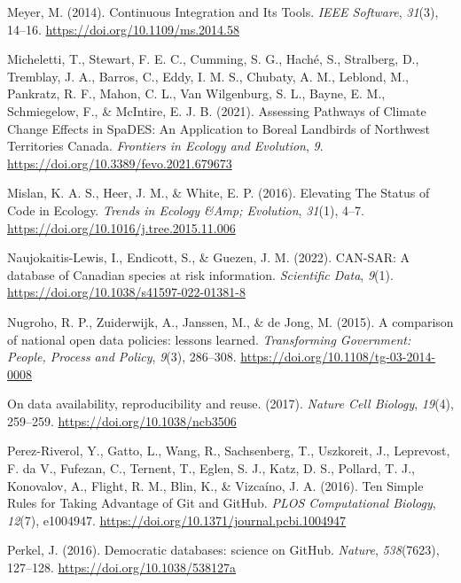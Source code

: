 \begin{CSLReferences}{1}{0}
\leavevmode{}%
Meyer, M. (2014). Continuous Integration and Its Tools. \emph{IEEE Software}, \emph{31}(3), 14--16. \url{https://doi.org/10.1109/ms.2014.58}

\leavevmode{}%
Micheletti, T., Stewart, F. E. C., Cumming, S. G., Haché, S., Stralberg, D., Tremblay, J. A., Barros, C., Eddy, I. M. S., Chubaty, A. M., Leblond, M., Pankratz, R. F., Mahon, C. L., Van Wilgenburg, S. L., Bayne, E. M., Schmiegelow, F., \& McIntire, E. J. B. (2021). Assessing Pathways of Climate Change Effects in SpaDES: An Application to Boreal Landbirds of Northwest Territories Canada. \emph{Frontiers in Ecology and Evolution}, \emph{9}. \url{https://doi.org/10.3389/fevo.2021.679673}

\leavevmode{}%
Mislan, K. A. S., Heer, J. M., \& White, E. P. (2016). Elevating The Status of Code in Ecology. \emph{Trends in Ecology \&Amp; Evolution}, \emph{31}(1), 4--7. \url{https://doi.org/10.1016/j.tree.2015.11.006}

\leavevmode{}%
Naujokaitis-Lewis, I., Endicott, S., \& Guezen, J. M. (2022). CAN-SAR: A database of Canadian species at risk information. \emph{Scientific Data}, \emph{9}(1). \url{https://doi.org/10.1038/s41597-022-01381-8}

\leavevmode{}%
Nugroho, R. P., Zuiderwijk, A., Janssen, M., \& de Jong, M. (2015). A comparison of national open data policies: lessons learned. \emph{Transforming Government: People, Process and Policy}, \emph{9}(3), 286--308. \url{https://doi.org/10.1108/tg-03-2014-0008}

\leavevmode{}%
On data availability, reproducibility and reuse. (2017). \emph{Nature Cell Biology}, \emph{19}(4), 259--259. \url{https://doi.org/10.1038/ncb3506}

\leavevmode{}%
Perez-Riverol, Y., Gatto, L., Wang, R., Sachsenberg, T., Uszkoreit, J., Leprevost, F. da V., Fufezan, C., Ternent, T., Eglen, S. J., Katz, D. S., Pollard, T. J., Konovalov, A., Flight, R. M., Blin, K., \& Vizcaíno, J. A. (2016). Ten Simple Rules for Taking Advantage of Git and GitHub. \emph{PLOS Computational Biology}, \emph{12}(7), e1004947. \url{https://doi.org/10.1371/journal.pcbi.1004947}

\leavevmode{}%
Perkel, J. (2016). Democratic databases: science on GitHub. \emph{Nature}, \emph{538}(7623), 127--128. \url{https://doi.org/10.1038/538127a}


\end{CSLReferences}
